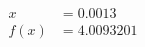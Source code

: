 \documentclass[preview]{standalone}
\begin{document}
\begin{align*}
x &= 0.0013\\f(x) &= 4.0093201
\end{align*}
\end{document}
